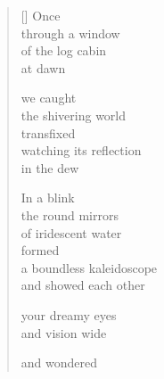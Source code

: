 \documentclass[12pt,a4paper]{article}
\begin{document}

\newpage

\poemtitle{}

\settowidth{\versewidth}{the infinite kaleidoscope}

\bigskip

\begin{verse}[\versewidth]
  Once \\
  through a window \\
  of the log cabin \\
  at dawn

  we caught \\
  the shivering world \\
  transfixed \\
  watching its reflection \\
  in the dew

  In a blink \\
  the round mirrors \\
  of iridescent water \\
  formed \\
  a boundless kaleidoscope \\
  and showed each other

  your dreamy eyes \\
  and vision wide

  and wondered
\end{verse}


\newpage

\poemtitle{}

\settowidth{\versewidth}{Yet you arise in the still second}

\bigskip
\end{document}
